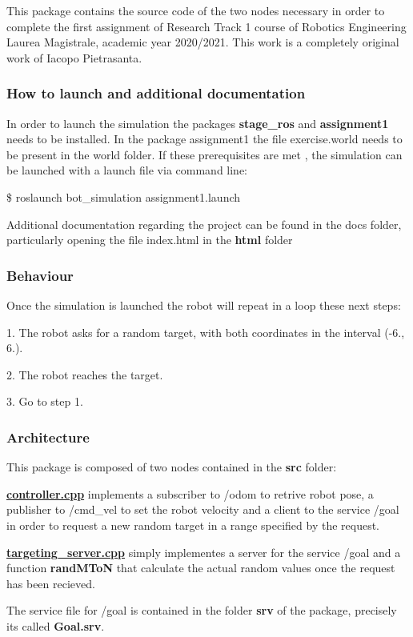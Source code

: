 This package contains the source code of the two nodes necessary in order to complete the first assignment of Research Track 1 course of Robotics Engineering Laurea Magistrale, academic year 2020/2021. This work is a completely original work of Iacopo Pietrasanta.

\subsubsection*{How to launch and additional documentation}

In order to launch the simulation the packages {\bfseries stage\+\_\+ros} and {\bfseries assignment1} needs to be installed. In the package assignment1 the file exercise.\+world needs to be present in the world folder. If these prerequisites are met , the simulation can be launched with a launch file via command line\+:

\$ roslaunch bot\+\_\+simulation assignment1.\+launch

Additional documentation regarding the project can be found in the docs folder, particularly opening the file index.\+html in the {\bfseries html} folder

\subsubsection*{Behaviour}

Once the simulation is launched the robot will repeat in a loop these next steps\+:


\begin{DoxyItemize}
\item 1. The robot asks for a random target, with both coordinates in the interval (-\/6., 6.).
\item 2. The robot reaches the target.
\item 3. Go to step 1.
\end{DoxyItemize}

\subsubsection*{Architecture}

This package is composed of two nodes contained in the {\bfseries src} folder\+:


\begin{DoxyItemize}
\item {\bfseries \hyperlink{controller_8cpp}{controller.\+cpp}} implements a subscriber to /odom to retrive robot pose, a publisher to /cmd\+\_\+vel to set the robot velocity and a client to the service /goal in order to request a new random target in a range specified by the request.
\item {\bfseries \hyperlink{targeting__server_8cpp}{targeting\+\_\+server.\+cpp}} simply implementes a server for the service /goal and a function {\bfseries rand\+M\+ToN} that calculate the actual random values once the request has been recieved.
\end{DoxyItemize}

The service file for /goal is contained in the folder {\bfseries srv} of the package, precisely it\textquotesingle{}s called {\bfseries Goal.\+srv}. 